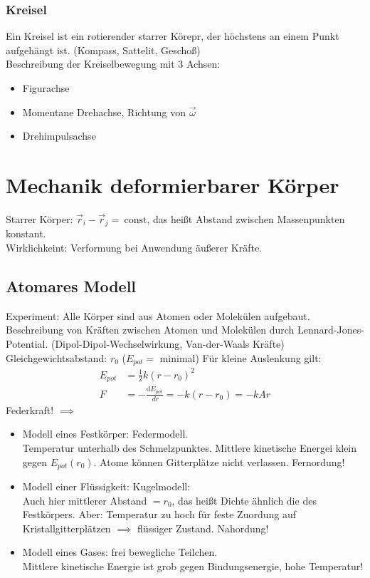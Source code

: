 \documentclass[a4paper]{scrartcl}
\renewcommand{\d}{\mathrm{d}}
\renewcommand{\v}[1]{\vec{#1}}
\newcommand{\dd}[2]{\frac{\d #1}{\ d#2}}
\theoremstyle{definition}
\theoremstyle{plain}
\theoremstyle{plain}
\theoremstyle{remark}
\theoremstyle{remark}
\theoremstyle{remark}
\begin{document}
\subsubsection{Kreisel}
\label{sec-8-8-1}
Ein Kreisel ist ein rotierender starrer Körepr, der höchstens an einem Punkt aufgehängt ist. (Kompass, Sattelit, Geschoß) \\
    Beschreibung der Kreiselbewegung mit 3 Achsen:
\begin{itemize}
\item Figurachse
\item Momentane Drehachse, Richtung von $\v \omega$
\item Drehimpulsachse
\end{itemize}
\section{Mechanik deformierbarer Körper}
\label{sec-9}
Starrer Körper: $\v r_i - \v r_j = ~\text{const}$, das heißt Abstand zwischen Massenpunkten konstant. \\
  Wirklichkeint: Verformung bei Anwendung äußerer Kräfte.
\subsection{Atomares Modell}
\label{sec-9-1}
Experiment: Alle Körper sind aus Atomen oder Molekülen aufgebaut.
Beschreibung von Kräften zwischen Atomen und Molekülen durch Lennard-Jones-Potential. (Dipol-Dipol-Wechselwirkung, Van-der-Waals Kräfte) \\
   Gleichgewichtsabstand: $r_0$ ($E_{pot} =$ minimal)
Für kleine Auslenkung gilt:
\begin{align*}
E_{pot} &= \frac{1}{2}k(r - r_0)^2 \\
F &= -\dd{E_{pot}}{r} = -k(r - r_0) = -k Ar
\end{align*}
Federkraft!
$\implies$
\begin{itemize}
\item Modell eines Festkörper: Federmodell. \\
     Temperatur unterhalb des Schmelzpunktes. Mittlere kinetische Energei klein gegen $E_{pot}(r_0)$.
Atome können Gitterplätze nicht verlassen. Fernordung!
\item Modell einer Flüssigkeit: Kugelmodell: \\
     Auch hier mittlerer Abstand $= r_0$, das heißt Dichte ähnlich die des Festkörpers.
Aber: Temperatur zu hoch für feste Zuordung auf Kristallgitterplätzen $\implies$ flüssiger Zustand. Nahordung!
\item Modell eines Gases: frei bewegliche Teilchen. \\
     Mittlere kinetische Energie ist grob gegen Bindungsenergie, hohe Temperatur!
\end{itemize}
\end{document}
